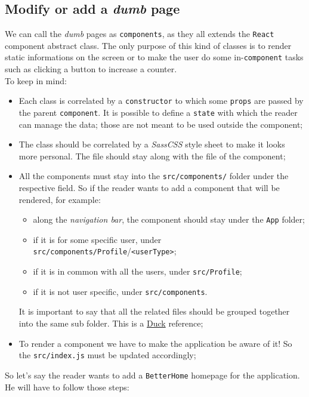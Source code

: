 \subsection{Modify or add a \emph{dumb} page}
We can call the \emph{dumb} pages as \verb|components|, as they all extends the \verb|React| component abstract class. The only purpose of this kind of classes is to render static informations on the screen or to make the user do some in-\verb|component| tasks such as clicking a button to increase a counter.
\\To keep in mind: 
\begin{itemize}
	\item Each class is correlated by a \verb|constructor| to which some \verb|props| are passed by the parent \verb|component|. It is possible to define a \verb|state| with which the reader can manage the data; those are not meant to be used outside the component;
	\item The class should be correlated by a \emph{SassCSS} style sheet to make it looks more personal. The file should stay along with the file of the component;
	\item All the components must stay into the \verb|src/components/| folder under the respective field. So if the reader wants to add a component that will be rendered, for example:
	\begin{itemize}
		\item along the \emph{navigation bar}, the component should stay under the \verb|App| folder;
		\item if it is for some specific user, under \verb|src/components/Profile|/\verb|<userType>|;
		\item if it is in common with all the users, under \verb|src/Profile|;
		\item if it is not user specific, under \verb|src/components|.
	\end{itemize}  
	It is important to say that all the related files should be grouped together into the same sub folder. This is a \href{https://medium.freecodecamp.org/scaling-your-redux-app-with-ducks-6115955638be}{Duck} reference;
	\item To render a component we have to make the application be aware of it! So the \verb|src/index.js| must be updated accordingly;
\end{itemize}
So let's say the reader wants to add a \verb|BetterHome| homepage for the application. He will have to follow those steps:
